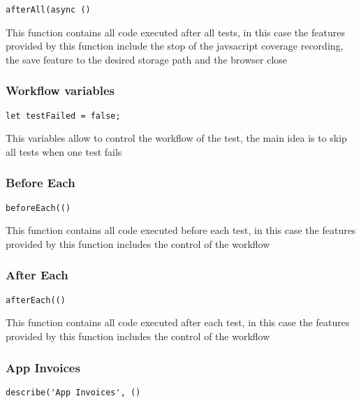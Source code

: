\documentclass[a4paper]{article}
\begin{document}
\begin{lstlisting}
afterAll(async ()
\end{lstlisting}

This function contains all code executed after all tests, in this case the
features provided by this function include the stop of the javsacript coverage
recording, the save feature to the desired storage path and the browser close

\hypertarget{toc662}{}
\subsubsection{Workflow variables}

\begin{lstlisting}
let testFailed = false;
\end{lstlisting}

This variables allow to control the workflow of the test, the main idea is to
skip all tests when one test fails

\hypertarget{toc663}{}
\subsubsection{Before Each}

\begin{lstlisting}
beforeEach(()
\end{lstlisting}

This function contains all code executed before each test, in this case the
features provided by this function includes the control of the workflow

\hypertarget{toc664}{}
\subsubsection{After Each}

\begin{lstlisting}
afterEach(()
\end{lstlisting}

This function contains all code executed after each test, in this case the
features provided by this function includes the control of the workflow

\hypertarget{toc665}{}
\subsubsection{App Invoices}

\begin{lstlisting}
describe('App Invoices', ()
\end{lstlisting}
\end{document}
